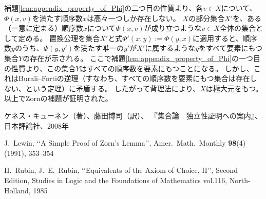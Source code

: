 ﻿\documentclass{ltjsarticle}
\theoremstyle{definition}
\begin{document}
補題\ref{lem:appendix_property_of_Phi}の二つ目の性質より、各$v \in X$について、$\Phi(x,v)$を満たす順序数$x$は高々一つしか存在しない。
$X$の部分集合$X'$を、ある（一意に定まる）順序数$x$について$\Phi(x,v)$が成り立つような$v \in X$全体の集合として定める。
置換公理を集合$X'$と式$\Phi'(x,y) := \Phi(y,x)$に適用すると、順序数$y$のうち、$\Phi(y,y')$を満たす唯一の$y'$が$X'$に属するような$y$をすべて要素にもつ集合$Y$の存在が示される。
ここで補題\ref{lem:appendix_property_of_Phi}の一つ目の性質より、この集合$Y$はすべての順序数を要素にもつことになる。
しかし、これはBurali--Fortiの逆理（すなわち、すべての順序数を要素にもつ集合は存在しない、という定理）に矛盾する。
したがって背理法により、$X$は極大元をもつ。
以上でZornの補題が証明された。

\begin{thebibliography}{9}

    ケネス・キューネン（著）、藤田博司（訳）、
    『集合論　独立性証明への案内』、
    日本評論社、2008年

    J.~Lewin,
    \lq\lq A Simple Proof of Zorn's Lemma\rq\rq,
    Amer.\ Math.\ Monthly \textbf{98}(4) (1991),
    353--354

    H.~Rubin, J.~E.~Rubin, 
    \lq\lq Equivalents of the Axiom of Choice, II\rq\rq, Second Edition, 
    Studies in Logic and the Foundations of Mathematics vol.116, North-Holland, 1985

\end{thebibliography}
\end{document}
